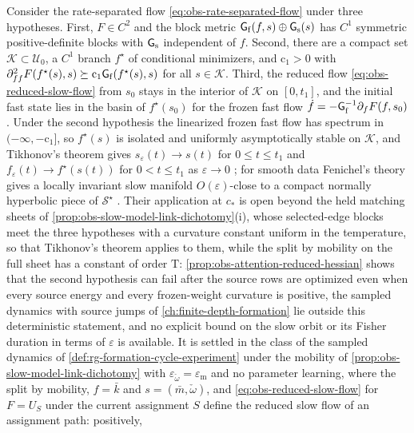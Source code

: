 Consider the rate-separated flow \eqref{eq:obs-rate-separated-flow} under three
hypotheses. First, $F\in C^2$ and the block metric
$\mathsf G_{\rm f}(f,s)\oplus\mathsf G_{\rm s}(s)$ has $C^1$ symmetric
positive-definite blocks with $\mathsf G_{\rm s}$ independent of $f$. Second, there
are a compact set $\mathcal K\subset\mathcal U_0$, a $C^1$ branch $f^\star$ of
conditional minimizers, and $\mathrm c_1>0$ with
$\partial^2_{ff}F(f^\star(s),s)\succeq\mathrm c_1\mathsf G_{\rm f}(f^\star(s),s)$ for
all $s\in\mathcal K$. Third, the reduced flow \eqref{eq:obs-reduced-slow-flow} from
$s_0$ stays in the interior of $\mathcal K$ on $[0,t_1]$, and the initial fast state
lies in the basin of $f^\star(s_0)$ for the frozen fast flow
$\dot f=-\mathsf G_{\rm f}^{-1}\partial_fF(f,s_0)$. Under the second hypothesis the
linearized frozen fast flow has spectrum in $(-\infty,-\mathrm c_1]$, so $f^\star(s)$
is isolated and uniformly asymptotically stable on $\mathcal K$, and Tikhonov's
theorem gives $s_\varepsilon(t)\to s(t)$ for $0\leq t\leq t_1$ and
$f_\varepsilon(t)\to f^\star(s(t))$ for $0<t\leq t_1$ as $\varepsilon\to0$
\citep{Tikhonov1952}; for smooth data Fenichel's theory gives a locally invariant
slow manifold $O(\varepsilon)$-close to a compact normally hyperbolic piece of
$\mathcal S^\star$ \citep{fenichel1979geometric}. Their application at $c_*$ is open
beyond the held matching sheets of \cref{prop:obs-slow-model-link-dichotomy}(i),
whose selected-edge blocks meet the three hypotheses with a curvature constant
uniform in the temperature, so that Tikhonov's theorem applies to them, while the
split by mobility on the full sheet has a constant of order $\mathrm T$:
\cref{prop:obs-attention-reduced-hessian} shows that the second hypothesis can fail
after the source rows are optimized even when every source energy and every
frozen-weight curvature is positive, the sampled dynamics with source jumps of
\cref{ch:finite-depth-formation} lie outside this deterministic statement, and no
explicit bound on the slow orbit or its Fisher duration in terms of $\varepsilon$ is
available. It is settled in the class of the sampled dynamics of
\cref{def:rg-formation-cycle-experiment} under the mobility of
\cref{prop:obs-slow-model-link-dichotomy} with $\varepsilon_{\check\omega}=\varepsilon_{\mathrm m}$
and no parameter learning, where the split by mobility, $f=\bar k$ and
$s=(\bar m,\check\omega)$, and \eqref{eq:obs-reduced-slow-flow} for $F=U_S$ under the
current assignment $S$ define the reduced slow flow of an assignment path: positively,
